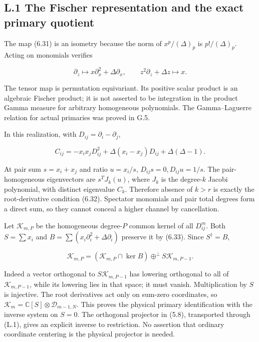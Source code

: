 \documentclass[a4paper,11pt]{article}
\numberwithin{equation}{section}
\begin{document}
\hypertarget{l.1-the-fischer-representation-and-the-exact-primary-quotient}{%
\subsection{L.1 The Fischer representation and the exact primary quotient}\label{l.1-the-fischer-representation-and-the-exact-primary-quotient}}

The map (6.31) is an isometry because the norm of \(x^p/(\Delta)_p\) is \(p!/(\Delta)_p\). Acting on monomials verifies

\[
\partial_z\mapsto x\partial_x^2+\Delta\partial_x,
\qquad z^2\partial_z+\Delta z\mapsto x.
\tag{L.1}
\]

The tensor map is permutation equivariant. Its positive scalar product is an algebraic Fischer product; it is not asserted to be integration in the product Gamma measure for arbitrary homogeneous polynomials. The Gamma--Laguerre relation for actual primaries was proved in G.5.

In this realization, with \(D_{ij}=\partial_i-\partial_j\),

\[
C_{ij}=-x_ix_jD_{ij}^2+\Delta(x_i-x_j)D_{ij}+\Delta(\Delta-1).
\tag{L.2}
\]

At pair sum \(s=x_i+x_j\) and ratio \(u=x_i/s\), \(D_{ij}s=0,D_{ij}u=1/s\). The pair-homogeneous eigenvectors are \(s^TJ_k(u)\), where \(J_k\) is the degree-\(k\) Jacobi polynomial, with distinct eigenvalue \(C_k\). Therefore absence of \(k>r\) is exactly the root-derivative condition (6.32). Spectator monomials and pair total degrees form a direct sum, so they cannot conceal a higher channel by cancellation.

Let \(\mathscr K_{m,P}\) be the homogeneous degree-\(P\) common kernel of all \(D_{ij}^m\). Both \(S=\sum x_i\) and \(B=\sum(x_i\partial_i^2+\Delta\partial_i)\) preserve it by (6.33). Since \(S^\dagger=B\),

\[
\mathscr K_{m,P}
=(\mathscr K_{m,P}\cap\ker B)
\mathbin{\oplus^\perp}S\mathscr K_{m,P-1}.
\tag{L.3}
\]

Indeed a vector orthogonal to \(S\mathscr K_{m,P-1}\) has lowering orthogonal to all of \(\mathscr K_{m,P-1}\), while its lowering lies in that space; it must vanish. Multiplication by \(S\) is injective. The root derivatives act only on sum-zero coordinates, so \(\mathscr K_m=\mathbb C[S]\otimes\mathscr D_{m-1,N}\). This proves the physical primary identification with the inverse system on \(S=0\). The orthogonal projector in (5.8), transported through (L.1), gives an explicit inverse to restriction. No assertion that ordinary coordinate centering is the physical projector is needed.
\end{document}
